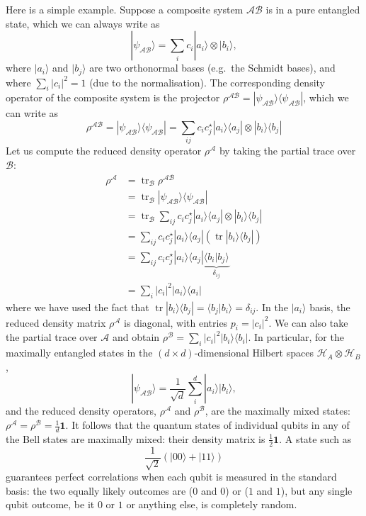 \documentclass[fleqn]{article}
\begin{document}
Here is a simple example.
Suppose a composite system \(\mathcal{AB}\) is in a pure entangled state, which we can always write as
\[
  |\psi_{\mathcal{AB}}\rangle
  = \sum_{i} c_{i} |a_i\rangle\otimes|b_i\rangle,
\]
where \(|a_i\rangle\) and \(|b_j\rangle\) are two orthonormal bases (e.g.~the Schmidt bases), and where \(\sum_i |c_i|^2 = 1\) (due to the normalisation).
The corresponding density operator of the composite system is the projector \(\rho^{\mathcal{AB}}= |\psi_{\mathcal{AB}}\rangle\langle\psi_{\mathcal{AB}}|\), which we can write as
\[
  \rho^{\mathcal{AB}}
  = |\psi_{\mathcal{AB}}\rangle\langle\psi_{\mathcal{AB}}|
  = \sum_{ij} c_i c^\star_j |a_i\rangle\langle a_j| \otimes |b_i\rangle\langle b_j|
\]
Let us compute the reduced density operator \(\rho^{\mathcal{A}}\) by taking the partial trace over \(\mathcal{B}\):
\[
  \begin{aligned}
    \rho^\mathcal{A}
    &= \operatorname{tr}_{\mathcal{B}}\rho^{\mathcal{AB}}
  \\&= \operatorname{tr}_{\mathcal{B}} |\psi_{\mathcal{AB}}\rangle\langle\psi_{\mathcal{AB}}|
  \\&= \operatorname{tr}_{\mathcal{B}} \sum_{ij} c_i c^\star_j |a_i\rangle\langle a_j| \otimes |b_i\rangle\langle b_j|
  \\&= \sum_{ij} c_i c^\star_j |a_i\rangle\langle a_j|(\operatorname{tr}|b_i\rangle\langle b_j|)
  \\&= \sum_{ij} c_i c^\star_j |a_i\rangle\langle a_j| \underbrace{\langle b_i|b_j\rangle}_{\delta_{ij}}
  \\& = \sum_{i} |c_i|^2 |a_i\rangle\langle a_i|
  \end{aligned}
\]
where we have used the fact that \(\operatorname{tr}|b_i\rangle\langle b_j| = \langle b_j|b_i\rangle=\delta_{ij}\).
In the \(|a_i\rangle\) basis, the reduced density matrix \(\rho^{\mathcal{A}}\) is diagonal, with entries \(p_i=|c_i|^2\).
We can also take the partial trace over \(\mathcal{A}\) and obtain \(\rho^\mathcal{B} = \sum_{i} |c_i|^2 |b_i\rangle\langle b_i|\).
In particular, for the maximally entangled states in the \((d\times d)\)-dimensional Hilbert spaces \(\mathcal{H}_A\otimes\mathcal{H}_B\),
\[
  |\psi_{\mathcal{AB}}\rangle
  = \frac{1}{\sqrt{d}} \sum_{i}^d |a_i\rangle|b_i\rangle,
\]
and the reduced density operators, \(\rho^\mathcal{A}\) and \(\rho^\mathcal{B}\), are the maximally mixed states: \(\rho^\mathcal{A}=\rho^\mathcal{B}=\frac{1}{d}\mathbf{1}\).
It follows that the quantum states of individual qubits in any of the Bell states are maximally mixed: their density matrix is \(\frac12\mathbf{1}\).
A state such as
\[
  \frac{1}{\sqrt 2} \left( |00\rangle + |11\rangle \right)
\]
guarantees perfect correlations when each qubit is measured in the standard basis: the two equally likely outcomes are (\(0\) and \(0\)) or (\(1\) and \(1\)), but any single qubit outcome, be it \(0\) or \(1\) or anything else, is completely random.
\end{document}
